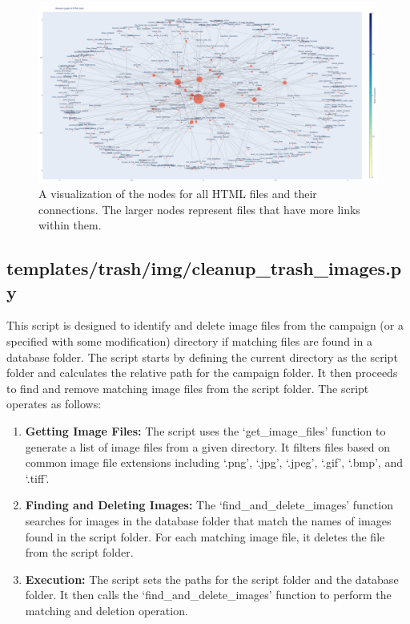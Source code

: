 \begin{figure}[h]
	\centering
	\includegraphics[width=\textwidth]{images/node_visualization.png}
	\caption{A visualization of the nodes for all HTML files and their connections. The larger nodes represent files that have more links within them.}
	\label{fig:node_visualization}
\end{figure}








\subsection{templates/trash/img/cleanup\_trash\_images.py}

This script is designed to identify and delete image files from the campaign (or a specified with some modification) directory if matching files are found in a database folder. The script starts by defining the current directory as the script folder and calculates the relative path for the campaign folder. It then proceeds to find and remove matching image files from the script folder. The script operates as follows:

\begin{enumerate}
    \item \textbf{Getting Image Files:} The script uses the `get\_image\_files' function to generate a list of image files from a given directory. It filters files based on common image file extensions including `.png', `.jpg', `.jpeg', `.gif', `.bmp', and `.tiff'.
    
    \item \textbf{Finding and Deleting Images:} The `find\_and\_delete\_images' function searches for images in the database folder that match the names of images found in the script folder. For each matching image file, it deletes the file from the script folder.
    
    \item \textbf{Execution:} The script sets the paths for the script folder and the database folder. It then calls the `find\_and\_delete\_images' function to perform the matching and deletion operation.
\end{enumerate}








